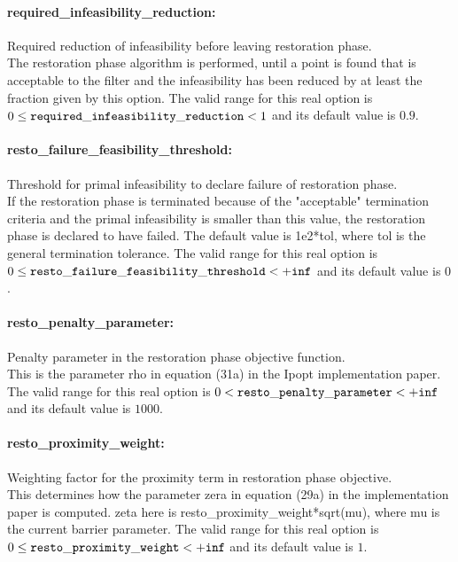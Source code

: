 \paragraph{required\_infeasibility\_reduction:}\label{sec:required_infeasibility_reduction} Required reduction of infeasibility before leaving restoration phase. $\;$ \\
 The restoration phase algorithm is performed,
until a point is found that is acceptable to the
filter and the infeasibility has been reduced by
at least the fraction given by this option. The valid range for this real option is 
$0 \le {\tt required\_infeasibility\_reduction } <  1$
and its default value is $0.9$.


\paragraph{resto\_failure\_feasibility\_threshold:}\label{sec:resto_failure_feasibility_threshold} Threshold for primal infeasibility to declare failure of restoration phase. $\;$ \\
 If the restoration phase is terminated because of
the "acceptable" termination criteria and the
primal infeasibility is smaller than this value,
the restoration phase is declared to have failed.
 The default value is 1e2*tol, where tol is the
general termination tolerance. The valid range for this real option is 
$0 \le {\tt resto\_failure\_feasibility\_threshold } <  {\tt +inf}$
and its default value is $0$.


\paragraph{resto\_penalty\_parameter:}\label{sec:resto_penalty_parameter} Penalty parameter in the restoration phase objective function. $\;$ \\
 This is the parameter rho in equation (31a) in
the Ipopt implementation paper. The valid range for this real option is 
$0 <  {\tt resto\_penalty\_parameter } <  {\tt +inf}$
and its default value is $1000$.


\paragraph{resto\_proximity\_weight:}\label{sec:resto_proximity_weight} Weighting factor for the proximity term in restoration phase objective. $\;$ \\
 This determines how the parameter zera in
equation (29a) in the implementation paper is
computed.  zeta here is
resto\_proximity\_weight*sqrt(mu), where mu is
the current barrier parameter. The valid range for this real option is 
$0 \le {\tt resto\_proximity\_weight } <  {\tt +inf}$
and its default value is $1$.


